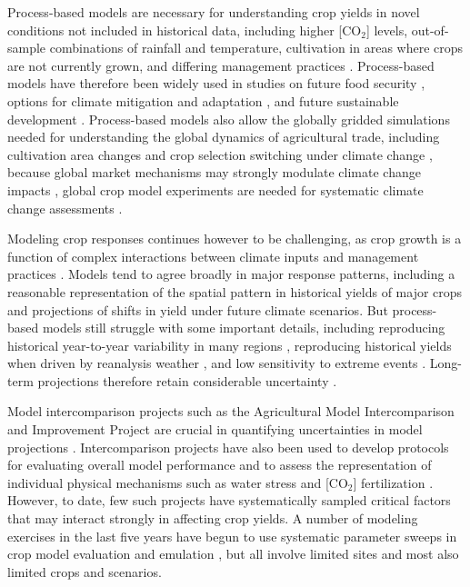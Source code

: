 \documentclass[gmd, manuscript]{copernicus} %
\begin{document}
Process-based models are necessary for understanding crop yields in novel conditions not included in historical data, including higher [CO$_2$] levels, out-of-sample combinations of rainfall and temperature, cultivation in areas where crops are not currently grown, and differing management practices \citep[e.g.][]{pugh_climate_2016, Roberts2017,minoli2019modelling}. Process-based models have therefore been widely used in studies on future food security \citep{wheeler2013climate}, options for climate mitigation \citep{muller2015} and adaptation \citep{challinor2018improving}, and future sustainable development \citep{humpenoder2018large}.
Process-based models also allow the globally gridded simulations needed for understanding  the global dynamics of agricultural trade, including  cultivation area changes and crop selection switching under climate change  \citep{rosenzweig2018,ruane2018}, because global market mechanisms may strongly modulate climate change impacts \citep{Stevanovic2016,hasegawa2018risk}, global crop model experiments are needed for systematic climate change assessments \citep{muller_global_2017}.

Modeling crop responses continues however to be challenging, as crop growth is a function of complex interactions between climate inputs and management practices \citep{Boote13,rotter2011}. 
Models tend to agree broadly in major response patterns, including a reasonable representation of the spatial pattern in historical yields of major crops \citep[e.g.][]{Elliott2015, muller_global_2017} and projections of shifts in yield under future climate scenarios. 
But process-based models still struggle with some important details, including reproducing historical year-to-year variability in many regions \citep[e.g.][]{muller_global_2017}, reproducing historical yields when driven by reanalysis weather \citep[e.g.][]{Glotter14}, and low sensitivity to extreme events \citep[e.g.][]{Glotter15, Jag2018, schewe2019}. 
Long-term projections therefore retain considerable uncertainty \citep{WOLF2002217, JAGTAP200273, Iizumi2010, ANGULO201332, Asseng2013, Asseng2015}. 

Model intercomparison projects such as the Agricultural Model Intercomparison and Improvement Project \citep[AgMIP, ][]{ROSENZWEIG2013} are crucial in quantifying uncertainties in model projections \citep{Rosenzweig2014}. Intercomparison projects have also been used to develop protocols for evaluating overall model performance \citep{Elliott2015, muller_global_2017} and to assess the representation of individual physical mechanisms such as water stress and [CO$_2$] fertilization \citep[e.g.][]{Schauberger2017}.
However, to date, few such projects have systematically sampled critical factors that may interact strongly in affecting crop yields. A number of modeling exercises in the last five years have begun to use
systematic parameter sweeps in crop model evaluation and emulation  \citep[e.g.][]{ruane2014, Markowski2015, Pirttioja2015,FRONZEK20182, Snyder2018, RUIZRAMOS2018}, but all involve limited sites and most also limited crops and scenarios. 
\end{document}
